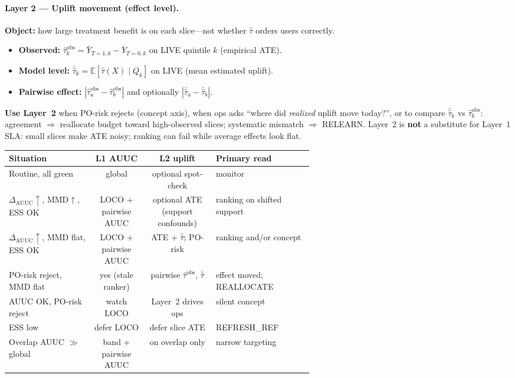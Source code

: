 \paragraph{Layer 2 --- Uplift movement (effect level).}
\textbf{Object:} how large treatment benefit is on each slice---not whether $\hat\tau$ orders users correctly.
\begin{itemize}
  \item \textbf{Observed:} $\widehat{\tau}^{\mathrm{obs}}_k=\bar Y_{T=1,k}-\bar Y_{T=0,k}$ on LIVE quintile $k$ (empirical ATE).
  \item \textbf{Model level:} $\bar{\hat\tau}_k=\mathbb E[\hat\tau(X)\mid Q_k]$ on LIVE (mean estimated uplift).
  \item \textbf{Pairwise effect:} $|\widehat{\tau}^{\mathrm{obs}}_a-\widehat{\tau}^{\mathrm{obs}}_b|$ and optionally $|\bar{\hat\tau}_a-\bar{\hat\tau}_b|$.
\end{itemize}
\textbf{Use Layer~2} when PO-risk rejects (concept axis), when ops asks ``where did \emph{realized} uplift move today?'', or to compare $\bar{\hat\tau}_k$ vs $\widehat{\tau}^{\mathrm{obs}}_k$: agreement $\Rightarrow$ reallocate budget toward high-observed slices; systematic mismatch $\Rightarrow$ RELEARN.
Layer~2 is \textbf{not} a substitute for Layer~1 SLA: small slices make ATE noisy; ranking can fail while average effects look flat.

\begin{center}
\small
\begin{tabular}{@{}p{0.28\linewidth}ccp{0.32\linewidth}@{}}
\toprule
\textbf{Situation} & \textbf{L1 AUUC} & \textbf{L2 uplift} & \textbf{Primary read} \\
\midrule
Routine, all green & global & optional spot-check & monitor \\
$\Delta_{\mathrm{AUUC}}\uparrow$, MMD$\uparrow$, ESS OK & LOCO + pairwise AUUC & optional ATE (support confounds) & ranking on shifted support \\
$\Delta_{\mathrm{AUUC}}\uparrow$, MMD flat, ESS OK & LOCO + pairwise AUUC & ATE + $\bar{\hat\tau}$; PO-risk & ranking and/or concept \\
PO-risk reject, MMD flat & yes (stale ranker) & pairwise $\widehat{\tau}^{\mathrm{obs}}$, $\bar{\hat\tau}$ & effect moved; REALLOCATE \\
AUUC OK, PO-risk reject & watch LOCO & Layer~2 drives ops & silent concept \\
ESS low & defer LOCO & defer slice ATE & REFRESH\_REF \\
Overlap AUUC $\gg$ global & band + pairwise AUUC & on overlap only & narrow targeting \\
\bottomrule
\end{tabular}
\end{center}

